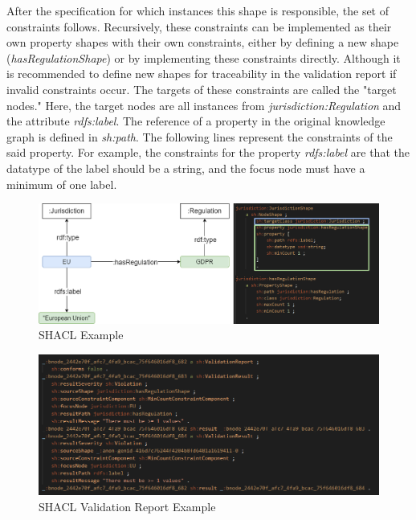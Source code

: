 \documentclass[
  a4paper,  %
  twoside,  %
  bibliography=totoc,
  headsepline,
  cleardoublepage=empty,
  parskip=half,
  draft=false
]{scrbook}
\begin{document}
After the specification for which instances this shape is responsible, the set of constraints follows. Recursively, these constraints can be implemented as their own property shapes with their own constraints, either by defining a new shape (\textit{hasRegulationShape}) or by implementing these constraints directly. Although it is recommended to define new shapes for traceability in the validation report if invalid constraints occur. The targets of these constraints are called the "target nodes." Here, the target nodes are all instances from \textit{jurisdiction:Regulation} and the attribute \textit{rdfs:label}. The reference of a property in the original knowledge graph is defined in \textit{sh:path}. The following lines represent the constraints of the said property. For example, the constraints for the property \textit{rdfs:label} are that the datatype of the label should be a string, and the focus node must have a minimum of one label.

\begin{figure}
  \centering
  \includegraphics[width=\textwidth]{graphics/shaclExampleFinished.png}
  \caption{SHACL Example}
  \label{fig:shacl}
\end{figure}

\begin{figure}
  \centering
  \includegraphics[width=\textwidth]{graphics/report.PNG}
  \caption{SHACL Validation Report Example}
  \label{fig:shaclValidation}
\end{figure}
\end{document}
